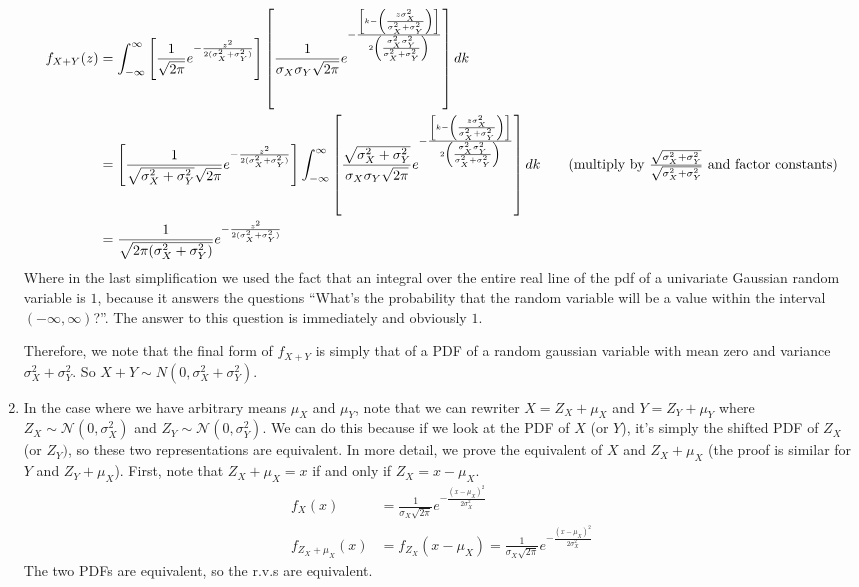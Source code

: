 \documentclass[submit]{harvardml}
\theoremstyle{plain}
\begin{document}
\begin{enumerate}[label=(\alph*)]
\begin{align*}
f_{X+Y}(z) &= \int_{-\infty}^{\infty} \left[\frac{1}{\sqrt{2\pi}}e^{-\frac{z^2}{2(\sigma_X^2 + \sigma_Y^2)}}\right]\left[\frac{1}{\sigma_X\sigma_Y\sqrt{2\pi}}e^{-\frac{\left[k - \left(\frac{z\sigma_X^2}{\sigma_X^2 + \sigma_Y^2} \right) \right]}{2\left(\frac{\sigma_X^2\sigma_Y^2}{\sigma_X^2 + \sigma_Y^2} \right)}} \right] dk \\
&= \left[\frac{1}{\sqrt{\sigma_X^2 + \sigma_Y^2}\sqrt{2\pi}}e^{-\frac{z^2}{2(\sigma_X^2 + \sigma_Y^2)}}\right] \int_{-\infty}^{\infty} \left[\frac{\sqrt{\sigma_X^2 + \sigma_Y^2}}{\sigma_X\sigma_Y\sqrt{2\pi}}e^{-\frac{\left[k - \left(\frac{z\sigma_X^2}{\sigma_X^2 + \sigma_Y^2} \right) \right]}{2\left(\frac{\sigma_X^2\sigma_Y^2}{\sigma_X^2 + \sigma_Y^2} \right)}} \right] dk \tag{multiply by $\frac{\sqrt{\sigma_X^2 + \sigma_Y^2}}{\sqrt{\sigma_X^2 + \sigma_Y^2}}$ and factor constants} \\
&= \frac{1}{\sqrt{2\pi(\sigma_X^2 + \sigma_Y^2)}}e^{-\frac{z^2}{2(\sigma_X^2 + \sigma_Y^2)}}
\end{align*}
Where in the last simplification we used the fact that an integral over the entire real line of the pdf of a univariate Gaussian random variable is $1$, because it answers the questions ``What's the probability that the random variable will be a value within the interval $(-\infty, \infty)$?''. The answer to this question is immediately and obviously $1$.

Therefore, we note that the final form of $f_{X+Y}$ is simply that of a PDF of a random gaussian variable with mean zero and variance $\sigma_X^2 + \sigma_Y^2$. So $X + Y \sim N(0,\sigma_X^2 + \sigma_Y^2)$.
\item In the case where we have arbitrary means $\mu_X$ and $\mu_Y$, note that we can rewriter $X = Z_X + \mu_X$ and $Y = Z_Y + \mu_Y$ where $Z_X \sim \mathcal{N}(0,\sigma_X^2)$ and $Z_Y \sim \mathcal{N}(0,\sigma_Y^2)$. We can do this because if we look at the PDF of $X$ (or $Y$), it's simply the shifted PDF of $Z_X$ (or $Z_Y)$, so these two representations are equivalent. In more detail, we prove the equivalent of $X$ and $Z_X + \mu_X$ (the proof is similar for $Y$ and $Z_Y + \mu_X$). First, note that $Z_X + \mu_X = x$ if and only if $Z_X = x - \mu_X$.
\begin{align*}
f_X(x) &= \frac{1}{\sigma_X\sqrt{2\pi}}e^{-\frac{(x-\mu_X)^2}{2\sigma_X^2}} \tag{by definition of univariate Gaussian pdf} \\
f_{Z_X + \mu_X}(x) &= f_{Z_X}(x - \mu_X) = \frac{1}{\sigma_X\sqrt{2\pi}}e^{-\frac{(x-\mu_X)^2}{2\sigma_X^2}}
\end{align*}
The two PDFs are equivalent, so the r.v.s are equivalent.


\end{enumerate}
\end{document}
